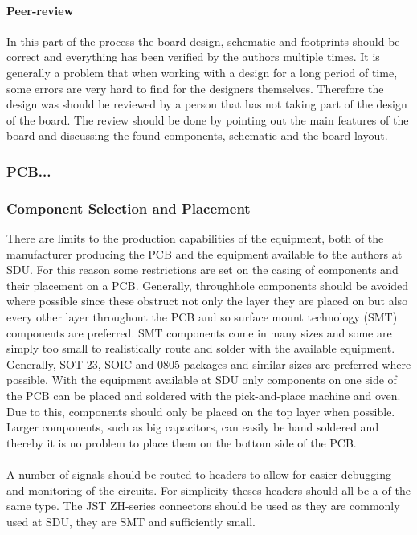 \paragraph{Peer-review}
In this part of the process the board design, schematic and footprints should be correct and everything has been verified by the authors multiple times.
It is generally a problem that when working with a design for a long period of time, some errors are very hard to find for the designers themselves. 
Therefore the design was should be reviewed by a person that has not taking part of the design of the board.
The review should be done by pointing out the main features of the board and discussing the found components, schematic and the board layout.



\subsubsection{PCB...} %


\subsubsection{Component Selection and Placement} %
\label{ssub:component_case_selection_and_placement}
There are limits to the production capabilities of the equipment, both of the manufacturer producing the PCB and the equipment available to the authors at SDU.
For this reason some restrictions are set on the casing of components and their placement on a PCB.
Generally, throughhole components should be avoided where possible since these obstruct not only the layer they are placed on but also every other layer throughout the PCB and so surface mount technology (SMT) components are preferred.
SMT components come in many sizes and some are simply too small to realistically route and solder with the available equipment.
Generally, SOT-23, SOIC and 0805 packages and similar sizes are preferred where possible.
With the equipment available at SDU only components on one side of the PCB can be placed and soldered with the pick-and-place machine and oven.
Due to this, components should only be placed on the top layer when possible.
Larger components, such as big capacitors, can easily be hand soldered and thereby it is no problem to place them on the bottom side of the PCB.
\\~\\
A number of signals should be routed to headers to allow for easier debugging and monitoring of the circuits.
For simplicity theses headers should all be a of the same type. 
The JST ZH-series connectors should be used as they are commonly used at SDU, they are SMT and sufficiently small. 


